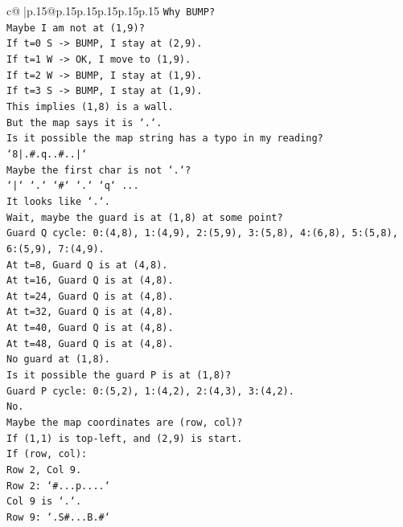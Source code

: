 \documentclass{article}
\begin{document}
{\begin{supertabular}{c@{$\;$}|p{.15\linewidth}@{}p{.15\linewidth}p{.15\linewidth}p{.15\linewidth}p{.15\linewidth}p{.15\linewidth}}
{{{\texttt{Why BUMP?} \\
\texttt{Maybe I am not at (1,9)?} \\
\texttt{If t=0 S {-}> BUMP, I stay at (2,9).} \\
\texttt{If t=1 W {-}> OK, I move to (1,9).} \\
\texttt{If t=2 W {-}> BUMP, I stay at (1,9).} \\
\texttt{If t=3 S {-}> BUMP, I stay at (1,9).} \\
\texttt{This implies (1,8) is a wall.} \\
\texttt{But the map says it is `.`.} \\
\texttt{Is it possible the map string has a typo in my reading?} \\
\texttt{`8|.\#.q..\#..|`} \\
\texttt{Maybe the first char is not `.`?} \\
\texttt{`|` `.` `\#` `.` `q` ...} \\
\texttt{It looks like `.`.} \\
\texttt{Wait, maybe the guard is at (1,8) at some point?} \\
\texttt{Guard Q cycle: 0:(4,8), 1:(4,9), 2:(5,9), 3:(5,8), 4:(6,8), 5:(5,8), 6:(5,9), 7:(4,9).} \\
\texttt{At t=8, Guard Q is at (4,8).} \\
\texttt{At t=16, Guard Q is at (4,8).} \\
\texttt{At t=24, Guard Q is at (4,8).} \\
\texttt{At t=32, Guard Q is at (4,8).} \\
\texttt{At t=40, Guard Q is at (4,8).} \\
\texttt{At t=48, Guard Q is at (4,8).} \\
\texttt{No guard at (1,8).} \\
\texttt{Is it possible the guard P is at (1,8)?} \\
\texttt{Guard P cycle: 0:(5,2), 1:(4,2), 2:(4,3), 3:(4,2).} \\
\texttt{No.} \\
\texttt{Maybe the map coordinates are (row, col)?} \\
\texttt{If (1,1) is top{-}left, and (2,9) is start.} \\
\texttt{If (row, col):} \\
\texttt{Row 2, Col 9.} \\
\texttt{Row 2: `\#...p....`} \\
\texttt{Col 9 is `.`.} \\
\texttt{Row 9: `.S\#...B.\#`} \\
}}}
\end{supertabular}}
\end{document}
